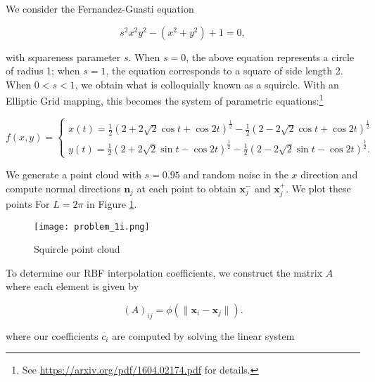 \begin{solution}
  We consider the Fernandez-Guasti equation

  $$
  s^2 x^2 y^2 - \left( x^2 + y^2 \right) + 1 = 0,
  $$

  with squareness parameter $s$. When $s = 0$, the above equation represents a circle of radius 1; when $s = 1$, the 
  equation corresponds to a square of side length 2. When $0 < s < 1$, we obtain what is colloquially known as a 
  squircle. With an Elliptic Grid mapping, this becomes the system of parametric equations:\footnote{
    See \href{https://arxiv.org/pdf/1604.02174.pdf}{https://arxiv.org/pdf/1604.02174.pdf} for details.
  }

  $$
  f(x, y) = \begin{cases}
    x(t) = \frac{1}{2} \left(2 + 2 \sqrt{2} \cos{t} + \cos{2t}\right)^{\frac{1}{2}} - \frac{1}{2} \left(2 - 2 \sqrt{2} \cos{t} + \cos{2t}\right)^{\frac{1}{2}}\\
    y(t) = \frac{1}{2} \left(2 + 2 \sqrt{2} \sin{t} - \cos{2t}\right)^{\frac{1}{2}} - \frac{1}{2} \left(2 - 2 \sqrt{2} \sin{t} - \cos{2t}\right)^{\frac{1}{2}}.
  \end{cases}
  $$

  \pagebreak
  We generate a point cloud with $s=0.95$ and random noise in the $x$ direction and compute normal directions $\bm{n}_j$ 
  at each point to obtain $\bm{x}^-_j$ and $\bm{x}^+_j$. We plot these points For $L = 2 \pi$ in Figure 
  \ref{fig:problem_1i}.

  \begin{figure}[h]
    \centering
    \texttt{[image: problem\_1i.png]}
    \caption{Squircle point cloud}
    \label{fig:problem_1i}
  \end{figure}

  \pagebreak
  To determine our RBF interpolation coefficients, we construct the matrix $A$ where each element is given by

  $$
  (A)_{ij} = \phi \left( \lVert \bm{x}_i - \bm{x}_j \rVert \right).
  $$

  where our coefficients $c_i$ are computed by solving the linear system


\end{solution}
